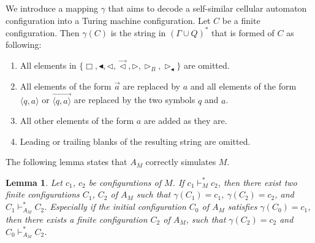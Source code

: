 \documentclass[pre,showpacs,showkeys,preprint]{revtex4}
\newtheorem{lemma}{Lemma}
\theoremstyle{definition}
\begin{document}
We introduce a mapping $\gamma$ that aims to decode a self-similar cellular automaton configuration into a Turing machine configuration.
Let $C$ be a finite configuration.
Then $\gamma(C)$ is the string in $(\Gamma \cup Q)^{*}$ that is formed of $C$ as following:
\begin{enumerate}
\item All elements in $\{\Box, \blacktriangleleft, \lhd, \overrightarrow{\lhd}, \rhd, \rhd_B, \rhd_\blacktriangleleft\}$ are omitted.
\item All elements of the form $\overrightarrow{a}$ are replaced by $a$ and all elements of the form
$\langle q,a  \rangle$ or $\overrightarrow{\langle q,a  \rangle}$ are replaced by the two symbols $q$ and $a$.
\item All other elements of the form $a$ are added as they are.
\item Leading or trailing blanks of the resulting string are omitted.
\end{enumerate}
The following lemma states that $A_M$ correctly simulates $M$.
\begin{lemma}
Let $c_1$, $c_2$ be configurations of $M$.
If $c_1 \vdash_M^* c_2$, then there exist two finite configurations $C_1$, $C_2$ of $A_M$
such that $\gamma(C_1) = c_1$, $\gamma(C_2) = c_2$, and $C_1 \vdash_{A_M}^* C_2$.
Especially if the initial configuration $C_0$ of $A_M$ satisfies  $\gamma(C_0) = c_1$,
then there exists a finite configuration $C_2$ of $A_M$, such that $\gamma(C_2) = c_2$
 and $C_0 \vdash_{A_M}^* C_2$.
\end{lemma}
\end{document}

